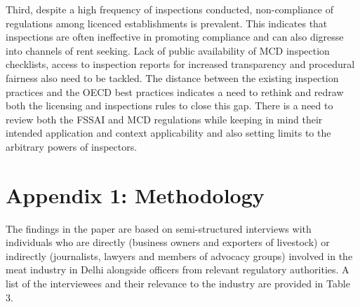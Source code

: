 \documentclass[a4paper, 12pt]{article}
\begin{document}
Third, despite a high frequency of inspections conducted, non-compliance of regulations among licenced establishments is prevalent. This indicates that inspections are often ineffective in promoting compliance and can also digresse into channels of rent seeking. Lack of public availability of MCD inspection checklists, access to inspection reports for increased transparency and procedural fairness also need to be tackled. The distance between the existing inspection practices and the OECD best practices indicates a need to rethink and redraw both the licensing and inspections rules to close this gap. There is a need to review both the FSSAI and MCD regulations while keeping in mind their intended application and context applicability and also setting limits to the arbitrary powers of inspectors. \\


\printbibliography[title={Bibliography}]
\newpage 
\section*{Appendix 1: Methodology}
The findings in the paper are based on semi-structured interviews with individuals who are directly (business owners and exporters of livestock) or indirectly (journalists, lawyers and members of advocacy groups) involved in the meat industry in Delhi alongside officers from relevant regulatory authorities. A list of the interviewees and their relevance to the industry are provided in Table 3. 
 
\end{document}
